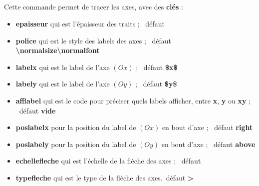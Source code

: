 \documentclass{article}
\newcommand\Cle[1]{{\bfseries\sffamily\textlangle #1\textrangle}}
\begin{document}
\begin{codetex}
\begin{tikzpicture}%
	[x=0.35cm,y=0.07cm,%
	Ox=1992,xmin=1992,xmax=2012,xgrille=2,xgrilles=1,%
	Oy=1640,ymin=1640,ymax=1730,ygrille=10,ygrilles=5]
	\PLgrilletikz
\end{tikzpicture}
~~
\end{codetex}

\begin{codesortie}
\hfill~
\begin{tikzpicture}%
	[x=0.35cm,y=0.07cm,%
	Ox=1992,xmin=1992,xmax=2012,xgrille=2,xgrilles=1,%
	Oy=1640,ymin=1640,ymax=1730,ygrille=10,ygrilles=5]
	\PLgrilletikz
\end{tikzpicture}
~~
\hfill~
\end{codesortie}

\begin{codetex}
	\PLaxestikz[<options>]
\end{codetex}

\begin{codecles}
Cette commande permet de tracer les axes, avec des \Cle{clés} :

\begin{itemize}
	\item \Cle{epaisseur} qui est l'épaisseur des traits ; \hfill~défaut \Cle{1.25pt}
	\item \Cle{police} qui est le style des labels des axes  ; \hfill~défaut \Cle{\textbackslash{}normalsize\textbackslash{}normalfont}
	\item \Cle{labelx} qui est le label de l'axe $(Ox)$ ; \hfill~défaut \Cle{\${}x\$}
	\item \Cle{labely} qui est le label de l'axe $(Oy)$ ; \hfill~défaut \Cle{\${}y\$}
	\item \Cle{afflabel} qui est le code pour préciser quels labels afficher, entre \Cle{x}, \Cle{y} ou \Cle{xy} ; \hfill~défaut \Cle{vide}
	\item \Cle{poslabelx} pour la position du label de $(Ox)$ en bout d'axe ; \hfill~défaut \Cle{right}
	\item \Cle{poslabely} pour la position du label de $(Oy)$ en bout d'axe ; \hfill~défaut \Cle{above}
	\item \Cle{echellefleche} qui est l'échelle de la flèche des axes ; \hfill~défaut \Cle{1}
	\item \Cle{typefleche} qui est le type de la flèche des axes.\hfill~défaut \Cle{>}
\end{itemize}
\end{codecles}
\end{document}
